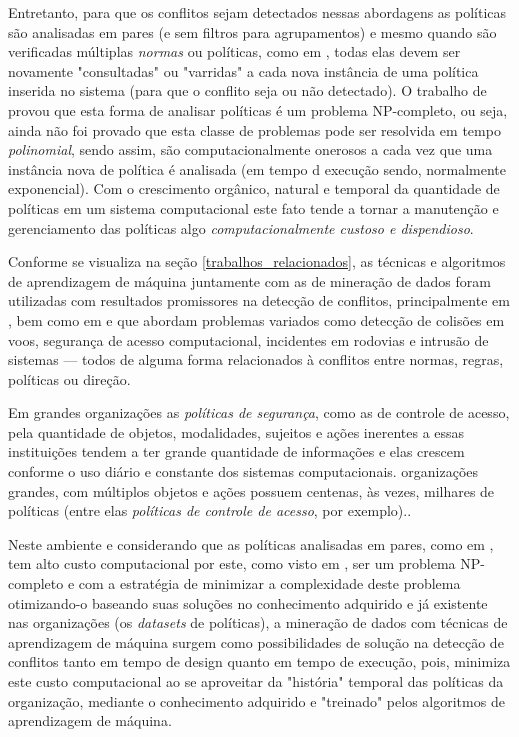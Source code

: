 Entretanto, para que os conflitos sejam detectados nessas abordagens as políticas são analisadas em pares (e sem filtros para agrupamentos) e mesmo quando são verificadas múltiplas \textit{normas} ou políticas, como em \cite{eduardo2017}, todas elas devem ser novamente "consultadas" ou "varridas" a cada nova instância de uma política inserida no sistema (para que o conflito seja ou não detectado). O trabalho de \cite{shoham_tennenholtz_1995} provou que esta forma de analisar políticas é um problema NP-completo, ou seja, ainda não foi provado que esta classe de problemas pode ser resolvida em tempo \textit{polinomial}, sendo assim, são computacionalmente onerosos a cada vez que uma instância nova de política é analisada (em tempo d execução sendo, normalmente exponencial). Com o crescimento orgânico, natural e temporal da quantidade de políticas em um sistema computacional este fato tende a tornar a manutenção e gerenciamento das políticas algo \textit{computacionalmente custoso e dispendioso}.   

Conforme se visualiza na seção \ref{trabalhos_relacionados}, as técnicas e algoritmos de aprendizagem de máquina juntamente com as de mineração de dados foram utilizadas com resultados promissores na detecção de conflitos, principalmente em \cite{obaidat_multilayer_1994}, \cite{chen_flight_2011} bem como em \cite{christodoulou_collision_2008} e \cite{jin_development_2002} que abordam problemas variados como detecção de colisões em voos, segurança de acesso computacional, incidentes em rodovias e intrusão de sistemas --- todos de alguma forma relacionados à conflitos entre normas, regras, políticas ou direção.  

Em grandes organizações as \textit{políticas de segurança}, como as de controle de acesso, pela quantidade de objetos, modalidades, sujeitos e ações inerentes a essas instituições tendem a ter grande quantidade de informações e elas crescem conforme o uso diário e constante dos sistemas computacionais. organizações grandes, com múltiplos objetos e ações possuem centenas, às vezes, milhares de políticas (entre elas \textit{políticas de controle de acesso}, por exemplo).\cite{fugini_information_2004}. 

Neste ambiente e considerando que as políticas analisadas em pares, como em \cite{sarkis2017}, tem alto custo computacional por este, como visto em \cite{shoham_tennenholtz_1995}, ser um problema NP-completo e com a estratégia de minimizar a complexidade deste problema otimizando-o baseando suas soluções no conhecimento adquirido e já existente nas organizações (os \textit{datasets} de políticas), a mineração de dados com técnicas de aprendizagem de máquina surgem como possibilidades de solução na detecção de conflitos tanto em tempo de design quanto em tempo de execução, pois, minimiza este custo computacional ao se aproveitar da "história" temporal das políticas da organização, mediante o conhecimento adquirido e "treinado" pelos algoritmos de aprendizagem de máquina.
